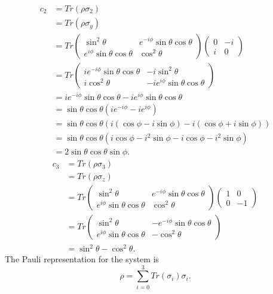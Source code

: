 \documentclass[10pt]{article}
\begin{document}
\begin{align*}
c_2 &= Tr(\rho \sigma_2) \\
      &= Tr(\rho \sigma_y) \\
      &= 
      Tr \begin{pmatrix}
          \sin^2 \theta                             & e^{-i\phi} \sin \theta \cos \theta \\
          e^{i\phi} \sin \theta \cos \theta & \cos^2 \theta
      \end{pmatrix}
      \begin{pmatrix}
      0 & -i \\
      i & 0
      \end{pmatrix} \\
      &=  Tr 
      \begin{pmatrix}
      ie^{-i\phi} \sin \theta \cos \theta & -i\sin^2 \theta \\
      i \cos^2 \theta & -ie^{i\phi} \sin \theta \cos \theta
      \end{pmatrix} \\
      &= ie^{-i\phi} \sin \theta \cos \theta - ie^{i\phi} \sin \theta \cos \theta \\
      &= \sin \theta \cos \theta (ie^{-i\phi} - ie^{i\phi}) \\
	  &= \sin \theta \cos \theta (i(\cos \phi - i \sin \phi) -i (\cos \phi + i \sin \phi)) \\
	  &= \sin \theta \cos \theta ( i\cos \phi -i^2 \sin \phi - i\cos \phi - i^2 \sin \phi ) \\
	  &= 2 \sin \theta \cos \theta \sin \phi.
\end{align*}
\begin{align*}
c_3 &= Tr(\rho \sigma_3) \\
      &= Tr(\rho \sigma_z) \\
      &= Tr
      \begin{pmatrix}
          \sin^2 \theta                             & e^{-i\phi} \sin \theta \cos \theta \\
          e^{i\phi} \sin \theta \cos \theta & \cos^2 \theta
      \end{pmatrix}
      \begin{pmatrix}
      1 & 0 \\
      0 & -1 
      \end{pmatrix} \\
      &= Tr
      \begin{pmatrix}
      \sin^2 \theta & -e^{-i\phi} \sin \theta \cos \theta \\
      e^{i\phi} \sin \theta \cos \theta & -\cos^2 \theta
      \end{pmatrix} \\
      &= \sin^2 \theta - \cos^2 \theta.
\end{align*}
The Pauli representation for the system is
\[
\rho = \sum_{i = 0}^{3} Tr(\sigma_i) \sigma_i.
\]
\end{document}
